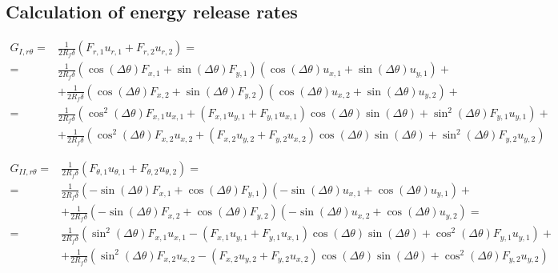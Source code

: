 \documentclass[a4paper]{jpconf}
\begin{document}
\subsection{Calculation of energy release rates}

\begin{equation}
\begin{split}
G_{I,r\theta} = &\frac{1}{2R_{f}\delta}\left(F_{r,1}u_{r,1}+F_{r,2}u_{r,2}\right)=\\
= &\frac{1}{2R_{f}\delta}\left(\cos\left(\Delta\theta\right) F_{x,1}+\sin\left(\Delta\theta\right)F_{y,1}\right)\left(\cos\left(\Delta\theta\right) u_{x,1}+\sin\left(\Delta\theta\right) u_{y,1}\right)+\\
&+\frac{1}{2R_{f}\delta}\left(\cos\left(\Delta\theta\right) F_{x,2}+\sin\left(\Delta\theta\right)F_{y,2}\right)\left(\cos\left(\Delta\theta\right) u_{x,2}+\sin\left(\Delta\theta\right) u_{y,2}\right)+\\
= &\frac{1}{2R_{f}\delta}\left(\cos^{2}\left(\Delta\theta\right) F_{x,1}u_{x,1}+\left(F_{x,1}u_{y,1}+F_{y,1}u_{x,1}\right)\cos\left(\Delta\theta\right)\sin\left(\Delta\theta\right)+\sin^{2}\left(\Delta\theta\right)F_{y,1}u_{y,1}\right)+\\
&+\frac{1}{2R_{f}\delta}\left(\cos^{2}\left(\Delta\theta\right) F_{x,2}u_{x,2}+\left(F_{x,2}u_{y,2}+F_{y,2}u_{x,2}\right)\cos\left(\Delta\theta\right)\sin\left(\Delta\theta\right)+\sin^{2}\left(\Delta\theta\right)F_{y,2}u_{y,2}\right)
\end{split}
\end{equation}

\begin{equation}
\begin{split}
G_{II,r\theta} = &\frac{1}{2R_{f}\delta}\left(F_{\theta,1}u_{\theta,1}+F_{\theta,2}u_{\theta,2}\right)=\\
= &\frac{1}{2R_{f}\delta}\left(-\sin\left(\Delta\theta\right) F_{x,1}+\cos\left(\Delta\theta\right)F_{y,1}\right)\left(-\sin\left(\Delta\theta\right) u_{x,1}+\cos\left(\Delta\theta\right) u_{y,1}\right)+\\
&+\frac{1}{2R_{f}\delta}\left(-\sin\left(\Delta\theta\right) F_{x,2}+\cos\left(\Delta\theta\right)F_{y,2}\right)\left(-\sin\left(\Delta\theta\right) u_{x,2}+\cos\left(\Delta\theta\right) u_{y,2}\right)=\\
= &\frac{1}{2R_{f}\delta}\left(\sin^{2}\left(\Delta\theta\right) F_{x,1}u_{x,1}-\left(F_{x,1}u_{y,1}+F_{y,1}u_{x,1}\right)\cos\left(\Delta\theta\right)\sin\left(\Delta\theta\right)+\cos^{2}\left(\Delta\theta\right)F_{y,1}u_{y,1}\right)+\\
 &+\frac{1}{2R_{f}\delta}\left(\sin^{2}\left(\Delta\theta\right) F_{x,2}u_{x,2}-\left(F_{x,2}u_{y,2}+F_{y,2}u_{x,2}\right)\cos\left(\Delta\theta\right)\sin\left(\Delta\theta\right)+\cos^{2}\left(\Delta\theta\right)F_{y,2}u_{y,2}\right)\\
\end{split}
\end{equation}
\end{document}
